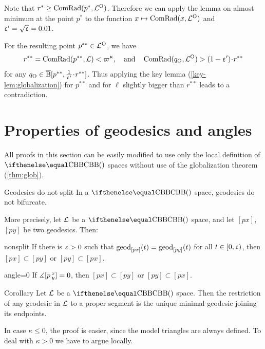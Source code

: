 Note that $r^*\ge\ComRad(p^*,\spc{L}^\o)$.
Therefore we can apply the lemma on almost minimum  
at the point $p^*$ to the function $x\z\mapsto\ComRad(x,\spc{L}^\o)$
and $\upvarepsilon'=\sqrt{\upvarepsilon}=0.01$.

For the resulting point $p^{{*}{*}}\in \spc{L}^\o$, we have 
\[r^{{*}{*}}\z=\ComRad(p^{{*}{*}},\spc{L})\z<\varpi\kappa, 
\quad\text{and} \quad
\ComRad(q_\o,\spc{L}^\o)\z> (1-\eps')\cdot r^{{*}{*}}\]
for any $q_\o\in\cBall[p^{{*}{*}},\tfrac{1}{\eps'}\cdot r^{{*}{*}}]$. 
Thus applying the key lemma (\ref{key-lem:globalization}) for $p^{{*}{*}}$ and for $\ell$ slightly bigger than $r^{{*}{*}}$ leads to a contradiction.
\qeds



\section{Properties of geodesics and angles}\label{sec:prop.geod}

All proofs in this section can be easily modified to use only the local definition of $\Alex{}$ spaces without use of the globalization theorem (\ref{thm:glob}).
 
\begin{thm}{Geodesics do not split}\label{thm:g-split}
In a $\Alex{}$ space, geodesics do not bifurcate.

More precisely, let $\mathcal{L}$ be a $\Alex{}$ space, and let $[p x]$, $[p y]$ be two geodesics.
Then:
\begin{subthm}{nonsplit} If  there is $\upvarepsilon>0$ such that $\mathrm{geod}_{[p x]}(t)=\mathrm{geod}_{[p y]}(t)$ 
for all $t\in[0,\eps)$, 
then $[p x]\subset [p y]$ or $[p y]\subset [p x]$.
\end{subthm}

\begin{subthm}{angle=0}
If $\measuredangle[p\,{}^{x}_{y}]=0$, then $[p x]\subset [p y]$ or $[p y]\subset [p x]$.
\end{subthm}
\end{thm}

\begin{thm}{Corollary}\label{cor:unique-geod-cbb}
Let $\mathcal{L}$ be a $\Alex{}$ space.
Then the restriction of any geodesic in $\mathcal{L}$ to a proper segment is the unique minimal geodesic joining its endpoints.
\end{thm}

In case $\kappa\le 0$, the proof is easier, since the model triangles are always defined.
To deal with $\kappa>0$ we have to argue locally.

